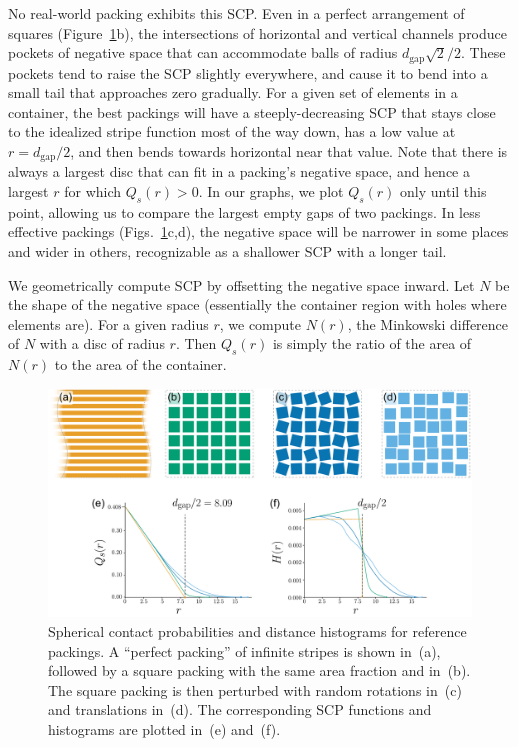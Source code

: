 No real-world packing exhibits this SCP.  Even in a perfect arrangement
of squares (Figure~\ref{hsr_viz}b), the intersections of horizontal and
vertical channels
produce pockets of negative space that can accommodate balls of
radius $d_\mathrm{gap}\sqrt{2}/2$.  These pockets tend to raise the SCP
slightly everywhere, and cause it to bend into a small tail that
approaches zero gradually.
For a given set of elements in a container, the best packings will
have a steeply-decreasing SCP that stays close to the idealized stripe function most
of the way down, has a low value at $r=d_\mathrm{gap}/2$,
and then bends towards horizontal near that value.
Note that there is always a largest disc that can fit in a packing's
negative space, and hence a largest $r$ for which $Q_s(r)>0$.  
In our graphs, we plot $Q_s(r)$ only until this point, allowing us
to compare the largest empty gaps of two packings.
In less effective packings (Figs.~\ref{hsr_viz}c,d), the negative space 
will be narrower in
some places and wider in others, recognizable as a shallower SCP
with a longer tail.

We geometrically compute SCP by offsetting the negative
space inward.  Let $N$ be the shape of the negative space (essentially
the container region with holes where elements are).  For a given radius
$r$, we compute $N(r)$, the Minkowski difference of $N$ with a disc of
radius $r$.  Then $Q_s(r)$ is simply the ratio of the area of $N(r)$ to
the area of the container.

\begin{figure}[h]
\centering
\includegraphics[width=1.0\textwidth]{figures/metrics/hsr_viz_big.pdf}
\caption[Spherical contact probabilities and distance histograms \newline for reference packings]
{\label{hsr_viz}
Spherical contact probabilities and distance histograms for 
reference packings.
A ``perfect packing'' of infinite stripes is shown in~(a),
followed by a square packing with the same area fraction and 
in~(b).  The square packing is then perturbed with random rotations in~(c)
and translations in~(d). The corresponding SCP functions and histograms are plotted
in~(e) and~(f).}
\end{figure}


